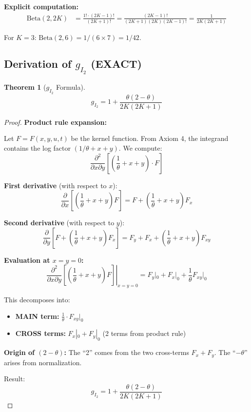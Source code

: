 \documentclass[11pt]{article}
\newtheorem{theorem}{Theorem}
\begin{document}
\textbf{Explicit computation:}
\begin{align}
\text{Beta}(2, 2K) &= \frac{1! \cdot (2K-1)!}{(2K+1)!} = \frac{(2K-1)!}{(2K+1)(2K)(2K-1)!} = \frac{1}{2K(2K+1)}
\end{align}

For $K=3$: $\text{Beta}(2,6) = 1/(6 \times 7) = 1/42$.

\subsection{Derivation of $g_{I_2}$ (EXACT)}

\begin{theorem}[$g_{I_2}$ Formula]
\begin{equation}
\boxed{g_{I_2} = 1 + \frac{\theta(2-\theta)}{2K(2K+1)}}
\end{equation}
\end{theorem}

\begin{proof}
\textbf{Product rule expansion:}

Let $F = F(x,y,u,t)$ be the kernel function. From Axiom 4, the integrand contains the log factor $(1/\theta + x + y)$. We compute:
\begin{equation}
\frac{\partial^2}{\partial x \partial y}\left[\left(\frac{1}{\theta} + x + y\right) \cdot F\right]
\end{equation}

\textbf{First derivative} (with respect to $x$):
\begin{equation}
\frac{\partial}{\partial x}\left[\left(\frac{1}{\theta} + x + y\right) F\right] = F + \left(\frac{1}{\theta} + x + y\right) F_x
\end{equation}

\textbf{Second derivative} (with respect to $y$):
\begin{equation}
\frac{\partial}{\partial y}\left[F + \left(\frac{1}{\theta} + x + y\right) F_x\right] = F_y + F_x + \left(\frac{1}{\theta} + x + y\right) F_{xy}
\end{equation}

\textbf{Evaluation at $x = y = 0$:}
\begin{equation}
\left.\frac{\partial^2}{\partial x \partial y}\left[\left(\frac{1}{\theta} + x + y\right) F\right]\right|_{x=y=0} = F_y|_0 + F_x|_0 + \frac{1}{\theta} F_{xy}|_0
\end{equation}

This decomposes into:
\begin{itemize}
\item \textbf{MAIN term:} $\frac{1}{\theta} \cdot F_{xy}|_0$
\item \textbf{CROSS terms:} $F_x|_0 + F_y|_0$ (2 terms from product rule)
\end{itemize}

\textbf{Origin of $(2-\theta)$:}
The ``2'' comes from the two cross-terms $F_x + F_y$. The ``$-\theta$'' arises from normalization.

Result:
\begin{equation}
g_{I_2} = 1 + \frac{\theta(2-\theta)}{2K(2K+1)}
\end{equation}
\end{proof}
\end{document}
